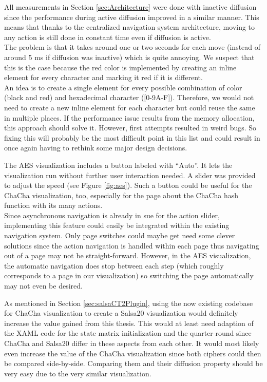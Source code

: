\begin{description}[style=nextline]
All measurements in Section \ref{sec:Architecture} were done with inactive diffusion since the performance during active diffusion improved in a similar manner. This means that thanks to the centralized navigation system architecture, moving to any action is still done in constant time even if diffusion is active. \\
The problem is that it takes around one or two seconds for each move (instead of around 5 ms if diffusion was inactive) which is quite annoying. We suspect that this is the case because the red color is implemented by creating an inline element for every character and marking it red if it is different. \\
An idea is to create a single element for every possible combination of color (black and red) and hexadecimal character ([0-9A-F]). Therefore, we would not need to create a new inline element for each character but could reuse the same in multiple places. If the performance issue results from the memory allocation, this approach should solve it. However, first attempts resulted in weird bugs. So fixing this will probably be the most difficult point in this list and could result in once again having to rethink some major design decisions.

\item[Automatic navigation]

The AES visualization includes a button labeled with ``Auto''. It lets the visualization run without further user interaction needed. A slider was provided to adjust the speed (see Figure \ref{fig:aes}). Such a button could be useful for the ChaCha visualization, too, especially for the page about the ChaCha hash function with its many actions. \\
Since asynchronous navigation is already in sue for the action slider, implementing this feature could easily be integrated within the existing navigation system. Only page switches could maybe get need some clever solutions since the action navigation is handled within each page thus navigating out of a page may not be straight-forward. However, in the AES visualization, the automatic navigation does stop between each step (which roughly corresponds to a page in our visualization) so switching the page automatically may not even be desired.

\item[Salsa20 visualization]

As mentioned in Section \ref{sec:salsaCT2Plugin}, using the now existing codebase for ChaCha visualization to create a Salsa20 visualization would definitely increase the value gained from this thesis. This would at least need adaption of the XAML code for the state matrix initialization and the quarter-round since ChaCha and Salsa20 differ in these aspects from each other. It would most likely even increase the value of the ChaCha visualization since both ciphers could then be compared side-by-side. Comparing them and their diffusion property should be very easy due to the very similar visualization.


\end{description}

